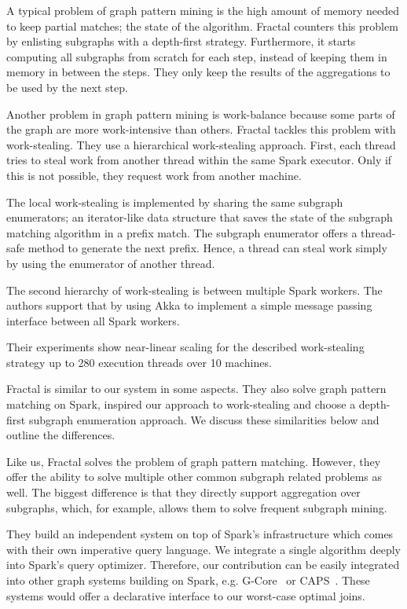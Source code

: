 A typical problem of graph pattern mining is the high amount of memory needed to keep partial matches;
the state of the algorithm.
Fractal counters this problem by enlisting subgraphs with a depth-first strategy.
Furthermore, it starts computing all subgraphs from scratch for each step, instead of keeping them in
memory in between the steps.
They only keep the results of the aggregations to be used by the next step.

Another problem in graph pattern mining is work-balance because some parts of the graph are
more work-intensive than others.
Fractal tackles this problem with work-stealing.
They use a hierarchical work-stealing approach.
First, each thread tries to steal work from another thread within the same Spark executor.
Only if this is not possible, they request work from another machine.

The local work-stealing is implemented by sharing the same subgraph enumerators;
an iterator-like data structure that saves the state of the subgraph matching algorithm in a prefix
match.
The subgraph enumerator offers a thread-safe method to generate the next prefix.
Hence, a thread can steal work simply by using the enumerator of another thread.

The second hierarchy of work-stealing is between multiple Spark workers.
The authors support that by using Akka to implement a simple message passing interface between
all Spark workers.

Their experiments show near-linear scaling for the described work-stealing strategy up to 280
execution threads over 10 machines.

Fractal is similar to our system in some aspects.
They also solve graph pattern matching on Spark, inspired our approach to work-stealing and
choose a depth-first subgraph enumeration approach.
We discuss these similarities below and outline the differences.

Like us, Fractal solves the problem of graph pattern matching.
However, they offer the ability to solve multiple other common subgraph related problems as well.
The biggest difference is that they directly support aggregation over subgraphs, which, for example,
allows them to solve frequent subgraph mining.

They build an independent system on top of Spark's infrastructure which comes with their own
imperative query language.
We integrate a single algorithm deeply into Spark's query optimizer.
Therefore, our contribution can be easily integrated into other graph systems building on Spark, e.g.
G-Core~\cite{gcore} or CAPS~\cite{caps}.
These systems would offer a declarative interface to our worst-case optimal joins.


